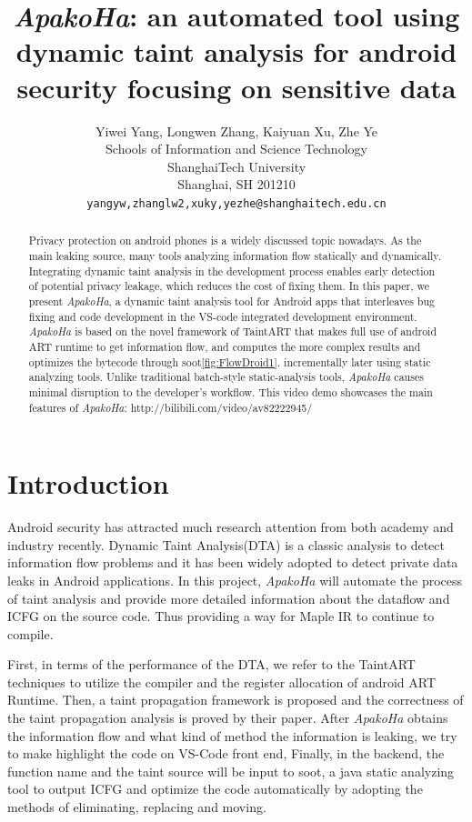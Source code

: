 \documentclass{article}
\title{\emph{ApakoHa}: an automated tool using dynamic taint analysis for android security focusing on sensitive data}
\author{
  Yiwei Yang, Longwen Zhang, Kaiyuan Xu, Zhe Ye \\
  Schools of Information and Science Technology\\
  ShanghaiTech University\\
  Shanghai, SH 201210 \\
  \texttt{yangyw,zhanglw2,xuky,yezhe@shanghaitech.edu.cn} \\
}
\begin{document}
\maketitle

\begin{abstract}
  Privacy protection on android phones is a widely discussed topic nowadays. As the main leaking source, many tools analyzing information flow statically and dynamically. Integrating dynamic taint analysis in the development process enables early detection of potential privacy leakage, which reduces the cost of fixing them.
  In this paper, we present \emph{ApakoHa}, a dynamic taint analysis tool for Android apps that interleaves bug fixing and code development in the VS-code integrated development environment. 
  \emph{ApakoHa} is based on the novel framework of TaintART that makes full use of android ART runtime to get information flow, and computes the more complex results and optimizes the bytecode through soot\ref{fig:FlowDroid1}. incrementally later using static analyzing tools. Unlike traditional batch-style static-analysis tools, \emph{ApakoHa} causes minimal disruption to the developer’s workflow. This video
demo showcases the main features of \emph{ApakoHa}: http://bilibili.com/video/av82222945/

\end{abstract}




\section{Introduction}
Android security has attracted much research attention from both academy 
            and industry recently. Dynamic Taint Analysis(DTA) is a classic analysis to detect
             information flow problems and it has been widely adopted to detect private
             data leaks in Android applications. In this project, \emph{ApakoHa} will automate the
             process of taint analysis and provide more detailed information about the dataflow and ICFG on the source code. Thus providing a way for Maple IR to continue to compile.

First, in terms of the performance of the DTA, we refer to the TaintART techniques to utilize the 
            compiler and the register allocation of android ART Runtime. Then, a taint propagation 
            framework is proposed and the correctness of the taint propagation analysis is proved by 
            their paper. After \emph{ApakoHa} obtains the information flow and what kind of method the information is leaking, we try to make highlight the code on VS-Code front end,
            Finally, in the backend, the function name and the taint source will be input to soot, a java static analyzing tool to output ICFG and optimize the code automatically  by adopting the methods of eliminating, replacing and moving.
\end{document}
